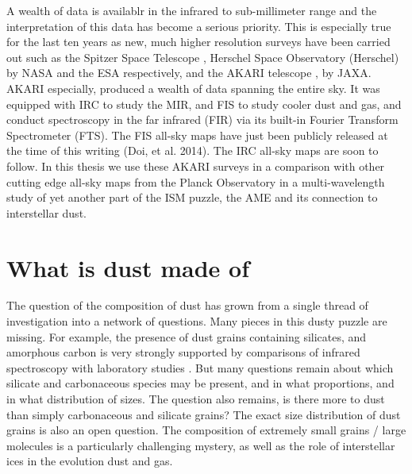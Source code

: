   A wealth of data is availablr in the infrared to sub-millimeter range and the interpretation of this data has become a serious priority. This is especially true for the last ten years as new, much higher resolution surveys have been carried out such as the Spitzer Space Telescope \cite{spitzer04}, Herschel Space Observatory (Herschel) \citep{herschel10} by NASA and the ESA respectively, and the AKARI telescope \citep{akari07},  by JAXA. AKARI especially, produced a wealth of data spanning the entire sky. It was equipped with IRC \citep{irc07} to study the MIR, and FIS \citep{fis07} to study cooler dust and gas, and conduct spectroscopy in the far infrared (FIR) via its built-in Fourier Transform Spectrometer (FTS). The FIS all-sky maps have just been publicly released at the time of this writing (Doi, et al. 2014). The IRC all-sky maps are soon to follow. In this thesis we use these AKARI surveys in a comparison with other cutting edge all-sky maps from the Planck Observatory in a multi-wavelength study of yet another part of the ISM puzzle, the AME and its connection to interstellar dust.
 



\section{What is dust made of}

The question of the composition of dust has grown from a single thread of investigation into a network of questions. Many pieces in this dusty puzzle are missing. For example, the presence of dust grains containing silicates, and amorphous carbon is very strongly supported by comparisons of infrared spectroscopy with laboratory studies \citep{hagen79,joblin09}. But many questions remain about which silicate and carbonaceous species may be present, and in what proportions, and in what distribution of sizes. The question also remains, is there more to dust than simply carbonaceous and silicate grains?  The exact size distribution of dust grains is also an open question. The composition of extremely small grains / large molecules is a particularly challenging mystery, as well as the role of interstellar ices in the evolution dust and gas.

